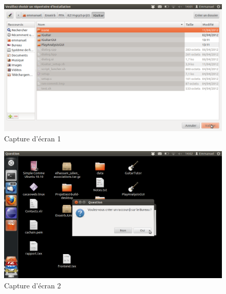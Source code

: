 \begin{figure}[!h]
\begin{center}
\includegraphics[scale=0.45]{choix_repertory.png}
\end{center}
\caption{Capture d'écran 1}
\end{figure}


\begin{figure}[!h]
\begin{center}
\includegraphics[scale=0.45]{install_fin.png}
\end{center}
\caption{Capture d'écran 2}
\end{figure}
